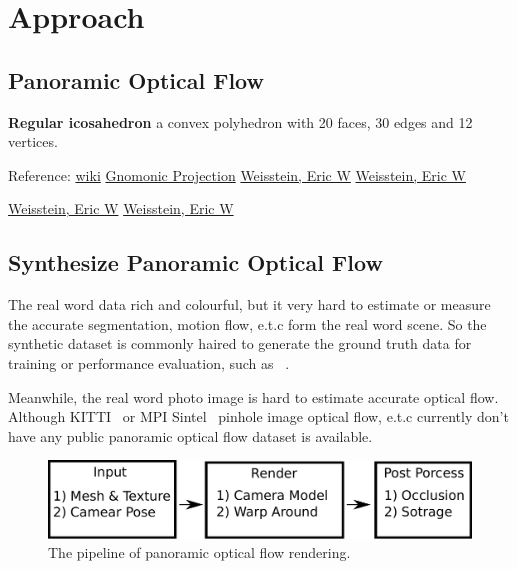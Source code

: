 

\chapter{Approach}\label{sec:approach}

\section{Panoramic Optical Flow}


\textbf{Regular icosahedron}
a convex polyhedron with 20 faces, 30 edges and 12 vertices. 

Reference:
\href{https://en.wikipedia.org/wiki/Regular_icosahedron}{wiki}
\href{https://mathworld.wolfram.com/GnomonicProjection.html}{Gnomonic Projection}
\href{https://mathworld.wolfram.com/RegularIcosahedron.html}{Weisstein, Eric W}
\href{https://math.wikia.org/wiki/Icosahedron}{Weisstein, Eric W}

\href{https://en.wikipedia.org/wiki/Gnomonic_projection}{Weisstein, Eric W}
\href{https://www.imo.net/observations/methods/visual-observation/minor/gnomonic/}{Weisstein, Eric W}



\section{Synthesize Panoramic Optical Flow}\label{sec:app:panoof}

The real word data rich and colourful, but it very hard to estimate or measure the accurate segmentation, motion flow, e.t.c form the real word scene.
So the synthetic dataset is commonly haired to generate the ground truth data for training or performance evaluation, such as ~\cite{habitat19iccv}.

Meanwhile, the real word photo image is hard to estimate accurate optical flow.
Although KITTI~\cite{Menze2018JPRS} or MPI Sintel~\cite{Butler:ECCV:2012} pinhole image optical flow, e.t.c currently don't have any public panoramic optical flow dataset is available.

\begin{figure}[hbt!]
	\centering
	\includegraphics[width=\linewidth]{images/synthetic_optical_flow/of_render.pdf}
	\caption{The pipeline of panoramic optical flow rendering.}
	\label{fig:approach:panoof:pipline}
\end{figure}

